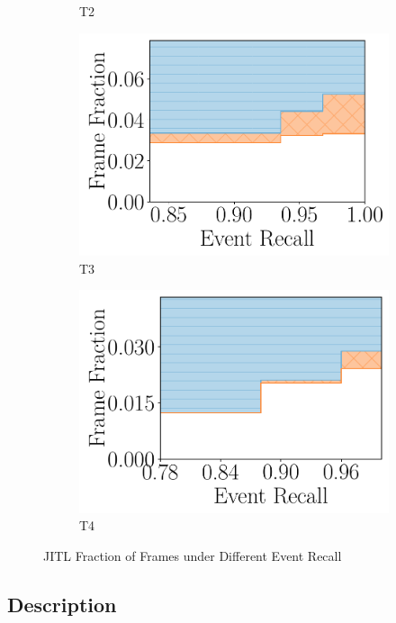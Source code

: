 \begin{figure}[h]
\begin{subfigure}[b]{.48\linewidth}
    \caption{T2}
    \end{subfigure}
    \begin{subfigure}[b]{.48\linewidth}
    \centering
        \includegraphics[width=\linewidth]{FIGS/fig-jitl-raft-eventrecall-step.pdf}
    \caption{T3}
    \end{subfigure}
    \begin{subfigure}[b]{.48\linewidth}
    \centering
        \includegraphics[width=\linewidth]{FIGS/fig-jitl-elephant-eventrecall-step.pdf}
    \caption{T4}
    \end{subfigure}
\caption{JITL Fraction of Frames under Different Event Recall}
\label{fig:jitl-eventrecall}
\end{figure}

\subsection{Description}

